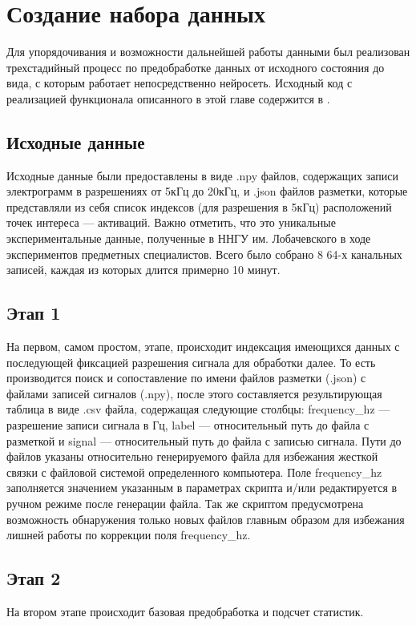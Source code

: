 \chapter{Создание набора данных}

Для упорядочивания и возможности дальнейшей работы данными был реализован
трехстадийный процесс по предобработке данных от исходного состояния до вида, с
которым работает непосредственно нейросеть. Исходный код с реализацией
функционала описанного в этой главе содержится в \cite{egm-dataset-source}.


\section{Исходные данные}

Исходные данные были предоставлены в виде .npy файлов, содержащих записи
электрограмм в разрешениях от 5кГц до 20кГц, и .json файлов разметки, которые
представляли из себя список индексов (для разрешения в 5кГц) расположений точек
интереса --- активаций. Важно отметить, что это уникальные экспериментальные
данные, полученные в ННГУ им. Лобачевского в ходе экспериментов предметных
специалистов. Всего было собрано 8 64-х канальных записей, каждая из которых
длится примерно 10 минут.


\section{Этап 1} На первом, самом простом, этапе, происходит индексация
имеющихся данных с последующей фиксацией разрешения сигнала для обработки
далее. То есть производится поиск и сопоставление по имени файлов разметки
(.json) с файлами записей сигналов (.npy), после этого составляется
результирующая таблица в виде .csv файла, содержащая следующие столбцы:
frequency\_hz --- разрешение записи сигнала в Гц, label --- относительный путь
до файла с разметкой и signal --- относительный путь до файла с записью
сигнала. Пути до файлов указаны относительно генерируемого файла для избежания
жесткой связки с файловой системой определенного компьютера. Поле frequency\_hz
заполняется значением указанным в параметрах скрипта и/или редактируется в
ручном режиме после генерации файла. Так же скриптом предусмотрена возможность
обнаружения только новых файлов главным образом для избежания лишней работы по
коррекции поля frequency\_hz.

\section{Этап 2} На втором этапе происходит базовая предобработка и подсчет
статистик.

